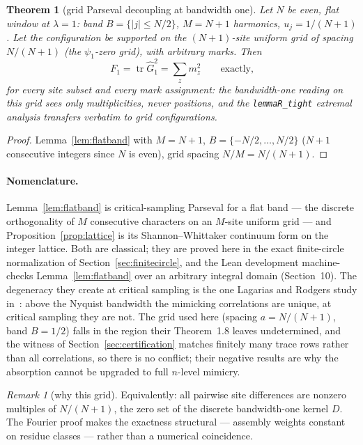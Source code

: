 \documentclass[11pt]{article}
\theoremstyle{plain}
\newtheorem{theorem}{Theorem}[section]
\theoremstyle{definition}
\theoremstyle{remark}
\newtheorem*{remk}{Remark}
\newcommand{\Gh}{\widehat{G}}
\newcommand{\tr}{\operatorname{tr}}
\begin{document}
\begin{theorem}[grid Parseval decoupling at bandwidth one]
\label{thm:parseval}
Let $N$ be even, flat window at $\lambda = 1$: band $B = \{|j| \le N/2\}$,
$M = N + 1$ harmonics, $u_j = 1/(N+1)$. Let the configuration be supported on the
$(N+1)$-site uniform grid of spacing $N/(N+1)$ (the $\psi_1$-zero grid), with
arbitrary marks. Then
\[
  F_1 = \tr \Gh_1^2 = \sum_z m_z^2 \qquad \text{exactly,}
\]
for every site subset and every mark assignment: the bandwidth-one reading on
this grid sees only multiplicities, never positions, and the
\texttt{lemmaR\_tight} extremal analysis transfers verbatim to grid
configurations.
\end{theorem}

\begin{proof}
Lemma~\ref{lem:flatband} with $M = N + 1$, $B = \{-N/2, \ldots, N/2\}$ ($N + 1$
consecutive integers since $N$ is even), grid spacing $N/M = N/(N+1)$.
\end{proof}

\paragraph{Nomenclature.}
Lemma~\ref{lem:flatband} is critical-sampling Parseval for a flat band --- the
discrete orthogonality of $M$ consecutive characters on an $M$-site uniform grid
--- and Proposition~\ref{prop:lattice} is its Shannon--Whittaker continuum form
on the integer lattice. Both are classical; they are proved here in the exact
finite-circle normalization of Section~\ref{sec:finitecircle}, and the Lean
development machine-checks Lemma~\ref{lem:flatband} over an arbitrary integral
domain (Section~10). The degeneracy they create at critical sampling is the one
Lagarias and Rodgers study in~\cite{LR21}: above the Nyquist bandwidth the
mimicking correlations are unique, at critical sampling they are not. The grid
used here (spacing $a = N/(N+1)$, band $B = 1/2$) falls in the region their
Theorem~1.8 leaves undetermined, and the witness of
Section~\ref{sec:certification} matches finitely many trace rows rather than all
correlations, so there is no conflict; their negative results are why the
absorption cannot be upgraded to full $n$-level mimicry.

\begin{remk}[why this grid]
Equivalently: all pairwise site differences are nonzero multiples of $N/(N+1)$,
the zero set of the discrete bandwidth-one kernel $D$. The Fourier proof makes
the exactness structural --- assembly weights constant on residue classes ---
rather than a numerical coincidence.
\end{remk}
\end{document}
